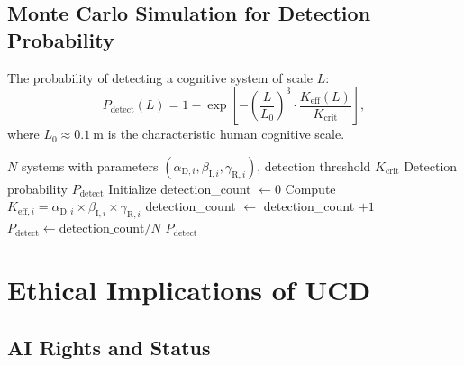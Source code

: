 \documentclass[12pt,a4paper]{article}
\newcommand{\eff}{\mathrm{eff}}
\newcommand{\Ke}{K_{\mathrm{eff}}}
\newcommand{\Kcrit}{K_{\mathrm{crit}}}
\begin{document}
	\subsection{Monte Carlo Simulation for Detection Probability}
	
	The probability of detecting a cognitive system of scale \(L\):
	\[
	P_{\mathrm{detect}}(L) = 1 - \exp\!\left[-\left(\frac{L}{L_0}\right)^3 \cdot \frac{\Ke(L)}{\Kcrit}\right],
	\]
	where \(L_0 \approx 0.1~\mathrm{m}\) is the characteristic human cognitive scale.
	
	\begin{algorithm}
		\caption{Monte Carlo Simulation of Cognitive System Detection}
		\begin{algorithmic}[1]
			\REQUIRE \(N\) systems with parameters \((\alpha_{\mathrm{D},i}, \beta_{\mathrm{I},i}, \gamma_{\mathrm{R},i})\), detection threshold \(\Kcrit\)
			\ENSURE Detection probability \(P_{\mathrm{detect}}\)
			\STATE Initialize detection\_count \(\gets 0\)
			\STATE Compute \(K_{\eff,i} = \alpha_{\mathrm{D},i} \times \beta_{\mathrm{I},i} \times \gamma_{\mathrm{R},i}\)
			\IF{\(K_{\eff,i} > \Kcrit\)}
			\STATE detection\_count \(\gets\) detection\_count \(+ 1\)
			\ENDIF
			\ENDFOR
			\STATE \(P_{\mathrm{detect}} \gets \text{detection\_count} / N\)
			\RETURN \(P_{\mathrm{detect}}\)
		\end{algorithmic}
	\end{algorithm}
	
	\section{Ethical Implications of UCD}
	
	\subsection{AI Rights and Status}
	
\end{document}
